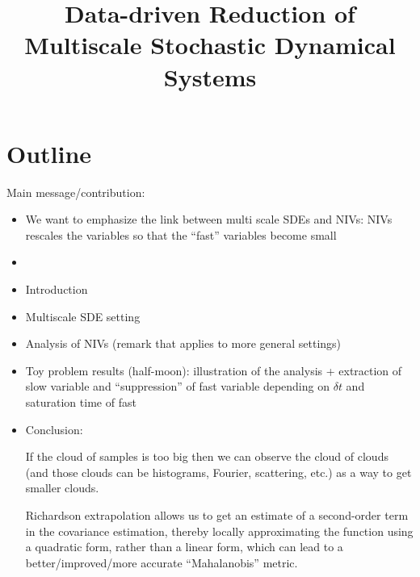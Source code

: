 \documentclass[12pt]{article}
\title{Data-driven Reduction of Multiscale Stochastic Dynamical Systems }
\begin{document}
\maketitle

\section{Outline}

Main message/contribution:
\begin{itemize}

\item We want to emphasize the link between multi scale SDEs and NIVs: NIVs rescales the variables so that the ``fast'' variables become small

\item 

\end{itemize}

\begin{itemize}

\item Introduction

\item Multiscale SDE setting 

\item Analysis of NIVs (remark that applies to more general settings)

\item Toy problem results (half-moon): illustration of the analysis + extraction of slow variable and ``suppression'' of fast variable depending on $\delta t$ and saturation time of fast

\item Conclusion: 

If the cloud of samples is too big then we can observe the cloud of clouds (and those clouds can be histograms, Fourier, scattering, etc.) as a way to get smaller clouds. 


Richardson extrapolation allows us to get an estimate of a second-order term in the covariance estimation, thereby locally approximating the function using a quadratic form, rather than a linear form,  which can lead to a better/improved/more accurate ``Mahalanobis'' metric. 


\end{itemize}
\end{document}
